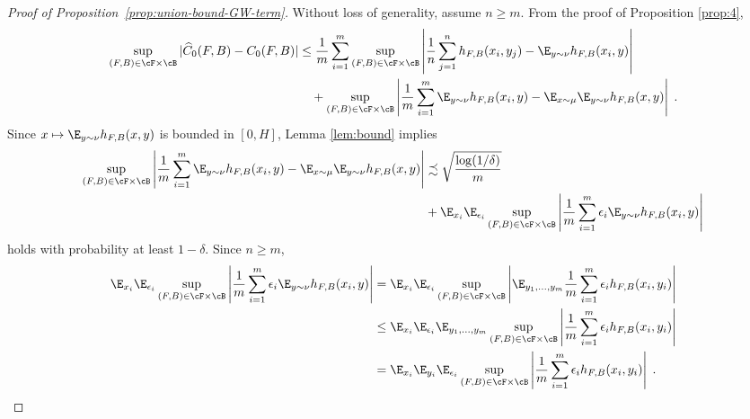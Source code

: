 \documentclass[11pt]{article}
\begin{document}
\begin{proof}[Proof of Proposition~\ref{prop:union-bound-GW-term}]
	Without loss of generality, assume $n \ge m$. From the proof of Proposition \ref{prop:4}, 
	\begin{equation*}
		\begin{split}
			\sup_{(F, B) \in \cF \times \cB} |\widehat{C}_0(F, B) - C_0(F, B)|
			& \le \frac{1}{m} \sum_{i=1}^{m} 
			\sup_{(F, B) \in \cF \times \cB} \left|\frac{1}{n} \sum_{j=1}^{n} h_{F, B}(x_i, y_j) - \E_{y \sim \nu} h_{F, B}(x_i, y)\right| \\
			& \quad + 
			\sup_{(F, B) \in \cF \times \cB} \left|\frac{1}{m} \sum_{i=1}^{m} \E_{y \sim \nu} h_{F, B}(x_i, y) - \E_{x \sim \mu} \E_{y \sim \nu} h_{F, B}(x, y)\right| \;.
		\end{split}
	\end{equation*}
	Since $x \mapsto \E_{y \sim \nu} h_{F, B}(x, y)$ is bounded in $[0, H]$, Lemma \ref{lem:bound} implies
	\begin{equation*}
		\begin{split}
			\sup_{(F, B) \in \cF \times \cB} \left|\frac{1}{m} \sum_{i=1}^{m} \E_{y \sim \nu} h_{F, B}(x_i, y) - \E_{x \sim \mu} \E_{y \sim \nu} h_{F, B}(x, y)\right|
			& \precsim
			\sqrt{\frac{\log(1 / \delta)}{m}} \\
			& + 
			\E_{x_i} \E_{\epsilon_i} \sup_{(F, B) \in \cF \times \cB} \left|\frac{1}{m} \sum_{i=1}^{m} \epsilon_i \E_{y \sim \nu} h_{F, B}(x_i, y) \right|
		\end{split}
	\end{equation*}
	holds with probability at least $1 - \delta$. Since $n \ge m$, 
	\begin{equation*}
		\begin{split}
			\E_{x_i} \E_{\epsilon_i} \sup_{(F, B) \in \cF \times \cB} \left|\frac{1}{m} \sum_{i=1}^{m} \epsilon_i \E_{y \sim \nu} h_{F, B}(x_i, y) \right| 
			& = 
			\E_{x_i} \E_{\epsilon_i} \sup_{(F, B) \in \cF \times \cB} \left|\E_{y_1, \ldots, y_m} \frac{1}{m} \sum_{i=1}^{m} \epsilon_i h_{F, B}(x_i, y_i) \right| \\
			& \le 
			\E_{x_i} \E_{\epsilon_i} \E_{y_1, \ldots, y_m} \sup_{(F, B) \in \cF \times \cB} \left|\frac{1}{m} \sum_{i=1}^{m} \epsilon_i h_{F, B}(x_i, y_i) \right| \\
			& =
			\E_{x_i} \E_{y_i} \E_{\epsilon_i} \sup_{(F, B) \in \cF \times \cB} \left|\frac{1}{m} \sum_{i=1}^{m} \epsilon_i h_{F, B}(x_i, y_i) \right| \;.
		\end{split}
	\end{equation*}

\end{proof}
\end{document}
